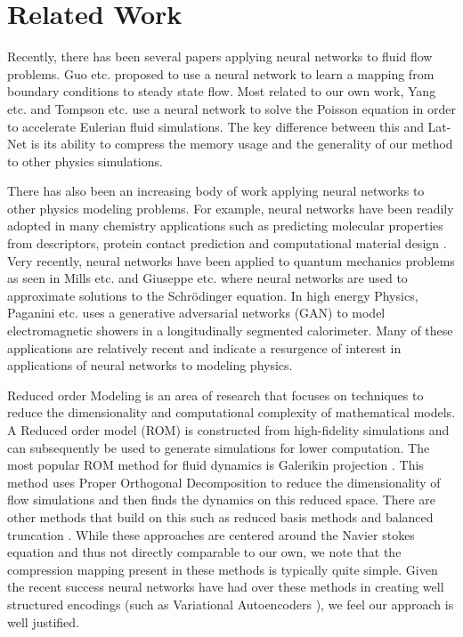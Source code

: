 \documentclass{article}
\begin{document}
\section{Related Work}

Recently, there has been several papers applying neural networks to fluid flow problems. Guo etc. \cite{guo2016convolutional} proposed to use a neural network to learn a mapping from boundary conditions to steady state flow. Most related to our own work, Yang etc. \cite{yang2016data} and Tompson etc. \cite{tompson2016accelerating} use a neural network to solve the Poisson equation in order to accelerate Eulerian fluid simulations. The key difference between this and Lat-Net is its ability to compress the memory usage and the generality of our method to other physics simulations.

There has also been an increasing body of work applying neural networks to other physics modeling problems. For example, neural networks have been readily adopted in many chemistry applications such as predicting molecular properties from descriptors, protein contact prediction and computational material design \cite{goh2017deep}. Very recently, neural networks have been applied to quantum mechanics problems as seen in Mills etc. \cite{mills2017deep} and Giuseppe etc. \cite{carleo2017solving} where neural networks are used to approximate solutions to the Schrödinger equation. In high energy Physics, Paganini etc. \cite{2017arXiv170502355P} uses a generative adversarial networks (GAN)\cite{goodfellow2014generative} to model electromagnetic showers in a longitudinally segmented calorimeter. Many of these applications are relatively recent and indicate a resurgence of interest in applications of neural networks to modeling physics.

Reduced order Modeling is an area of research that focuses on techniques to reduce the dimensionality and computational complexity of mathematical models. A Reduced order model (ROM) is constructed from high-fidelity simulations and can subsequently be used to generate simulations for lower computation. The most popular ROM method for fluid dynamics is Galerikin projection \cite{rowley2004model} \cite{barone2009reduced}. This method uses Proper Orthogonal Decomposition to reduce the dimensionality of flow simulations and then finds the dynamics on this reduced space. There are other methods that build on this such as reduced basis methods and balanced truncation \cite{veroy2005certified} \cite{rowley2005model}. While these approaches are centered around the Navier stokes equation and thus not directly comparable to our own, we note that the compression mapping present in these methods is typically quite simple. Given the recent success neural networks have had over these methods in creating well structured encodings (such as Variational Autoencoders \cite{kingma2013auto} \cite{watter2015embed}), we feel our approach is well justified.
\end{document}
